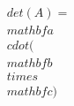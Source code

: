 \documentclass[preview]{standalone}
\begin{document}
\begin{align*}
\quad\\det(A) = \quad\\mathbf{a} \quad\\cdot (\quad\\mathbf{b} \quad\\times \quad\\mathbf{c})
\end{align*}
\end{document}
